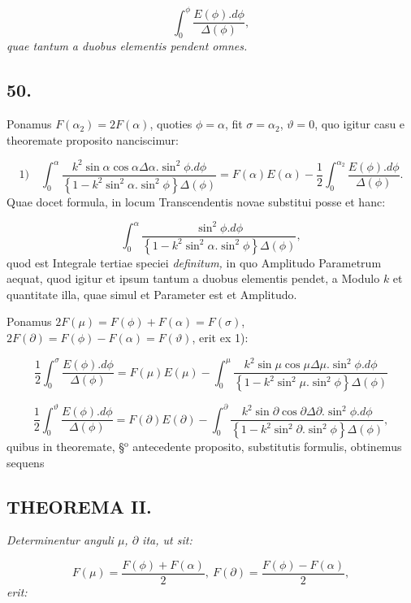 \documentclass{article}
\begin{document}
\[
\int_{0}^{\phi}\frac{E(\phi).d\phi}{\Delta(\phi)},
\]
\emph{quae tantum a duobus elementis pendent omnes.}

\subsection*{50.}

Ponamus $F(\alpha_{2})=2F(\alpha)$, quoties $\phi=\alpha$, fit $\sigma=\alpha_{2}$, $\vartheta=0$, quo igitur casu e theoremate proposito nanciscimur:

\[
\text{1)}\quad\int_{0}^{\alpha}\frac{k^{2}\sin\alpha\cos\alpha\Delta\alpha.\sin^{2}\phi.d\phi}{\left\{1-k^{2}\sin^{2}\alpha.\sin^{2}\phi\right\}\Delta(\phi)}=F(\alpha)E(\alpha)-\frac{1}{2}\int_{0}^{\alpha_{2}}\frac{E(\phi).d\phi}{\Delta(\phi)}.
\]
Quae docet formula, in locum Transcendentis novae substitui posse et hanc:

\[
\int_{0}^{\alpha}\frac{\sin^{2}\phi.d\phi}{\left\{1-k^{2}\sin^{2}\alpha.\sin^{2}\phi\right\}\Delta(\phi)},
\]
quod est Integrale tertiae speciei \emph{definitum,} in quo Amplitudo Parametrum aequat, quod igitur et ipsum tantum a duobus elementis pendet, a Modulo $k$ et quantitate illa, quae simul et Parameter est et Amplitudo.

Ponamus $2F(\mu)=F(\phi)+F(\alpha)=F(\sigma)$, $2F(\partial)=F(\phi)-F(\alpha)=F(\vartheta)$, erit ex 1):

\[
\frac{1}{2}\int_{0}^{\sigma}\frac{E(\phi).d\phi}{\Delta(\phi)}=F(\mu)E(\mu)-\int_{0}^{\mu}\frac{k^{2}\sin\mu\cos\mu\Delta\mu.\sin^{2}\phi.d\phi}{\left\{1-k^{2}\sin^{2}\mu.\sin^{2}\phi\right\}\Delta(\phi)}
\]

\[
\frac{1}{2}\int_{0}^{\vartheta}\frac{E(\phi).d\phi}{\Delta(\phi)}=F(\partial)E(\partial)-\int_{0}^{\partial}\frac{k^{2}\sin\partial\cos\partial\Delta\partial.\sin^{2}\phi.d\phi}{\left\{1-k^{2}\sin^{2}\partial.\sin^{2}\phi\right\}\Delta(\phi)},
\]
quibus in theoremate, §$^{\mathrm{o}}$ antecedente proposito, substitutis formulis, obtinemus sequens

\subsection*{THEOREMA II.}

\emph{Determinentur anguli $\mu$, $\partial$ ita, ut sit:}

\[
F(\mu)=\frac{F(\phi)+F(\alpha)}{2},\ F(\partial)=\frac{F(\phi)-F(\alpha)}{2},
\]
\emph{erit:}
\end{document}
